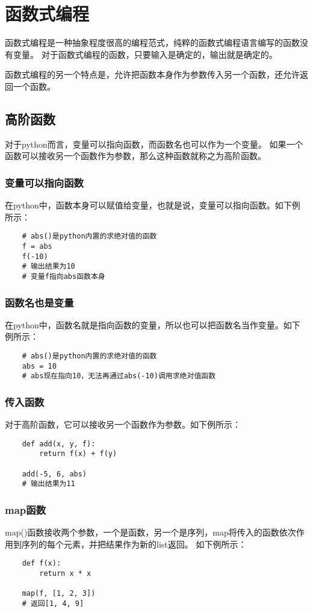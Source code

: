 \documentclass[a4paper,left=2.5cm,right=2.5cm,11pt]{article}
\begin{document}
\tableofcontents

\clearpage

\section{函数式编程}
	函数式编程是一种抽象程度很高的编程范式，纯粹的函数式编程语言编写的函数没有变量。
	对于函数式编程的函数，只要输入是确定的，输出就是确定的。\par

	函数式编程的另一个特点是，允许把函数本身作为参数传入另一个函数，还允许返回一个函数。

\subsection{高阶函数}
	对于python而言，变量可以指向函数，而函数名也可以作为一个变量。
	如果一个函数可以接收另一个函数作为参数，那么这种函数就称之为高阶函数。

\subsubsection{变量可以指向函数}
	在python中，函数本身可以赋值给变量，也就是说，变量可以指向函数。如下例所示：
	\begin{lstlisting}
	# abs()是python内置的求绝对值的函数
	f = abs
	f(-10)
	# 输出结果为10
	# 变量f指向abs函数本身
	\end{lstlisting}

\subsubsection{函数名也是变量}
	在python中，函数名就是指向函数的变量，所以也可以把函数名当作变量。如下例所示：
	\begin{lstlisting}
	# abs()是python内置的求绝对值的函数
	abs = 10
	# abs现在指向10，无法再通过abs(-10)调用求绝对值函数
	\end{lstlisting}

\subsubsection{传入函数}
	对于高阶函数，它可以接收另一个函数作为参数。如下例所示：
	\begin{lstlisting}
	def add(x, y, f):
		return f(x) + f(y)

	add(-5, 6, abs)
	# 输出结果为11
	\end{lstlisting}

\subsubsection{map函数}
	map()函数接收两个参数，一个是函数，另一个是序列，map将传入的函数依次作用到序列的每个元素，并把结果作为新的list返回。
	如下例所示：
	\begin{lstlisting}
	def f(x):
		return x * x

	map(f, [1, 2, 3])
	# 返回[1, 4, 9]
	\end{lstlisting}
\end{document}
